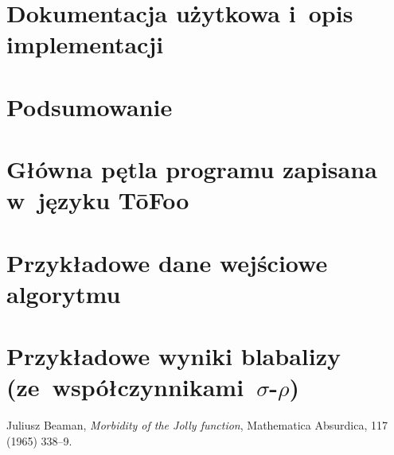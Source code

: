 \documentclass[]{pracamgr}
\begin{document}
\chapter{Dokumentacja użytkowa i~opis implementacji}

\chapter{Podsumowanie}

\appendix

\chapter{Główna pętla programu zapisana w~języku T\=oFoo}

\chapter{Przykładowe dane wejściowe algorytmu}

\chapter{Przykładowe wyniki blabalizy
    (ze~współczynnikami~$\sigma$-$\rho$)}

\begin{thebibliography}{99}

 Juliusz Beaman, \textit{Morbidity of the Jolly
    function}, Mathematica Absurdica, 117 (1965) 338--9.

\end{thebibliography}
\end{document}
